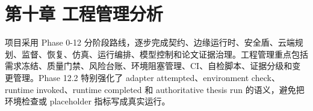 \chapter{第十章 工程管理分析}

项目采用 Phase 0-12 分阶段路线，逐步完成契约、边缘运行时、安全盾、云端规划、监督、恢复、仿真、运行编排、模型控制和论文证据治理。工程管理重点包括需求冻结、质量门禁、风险台账、环境阻塞管理、CI、自检脚本、证据分级和变更管理。Phase 12.2 特别强化了 adapter attempted、environment check、runtime invoked、runtime completed 和 authoritative thesis run 的语义，避免把环境检查或 placeholder 指标写成真实运行。\par
